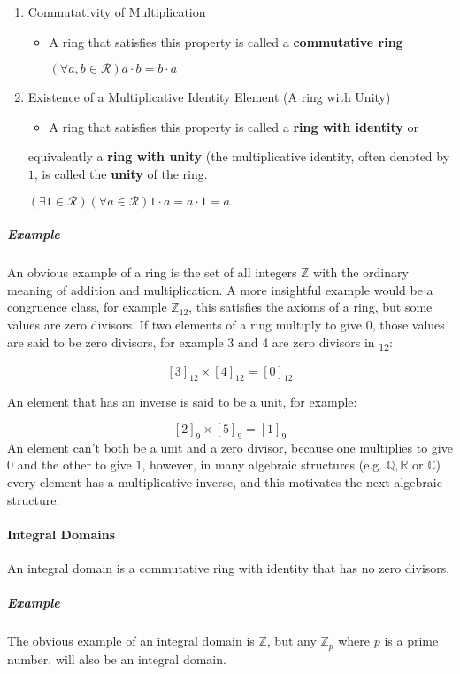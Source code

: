 \documentclass[a4paper,11pt,twoside]{article}
\begin{document}
\begin{enumerate}
\item Commutativity of Multiplication
\begin{itemize}
\item A ring that satisfies this property is called a \textbf{commutative ring}

\(\left( \forall a,b \in \mathcal{R} \right) a \cdot  b = b \cdot  a\)
\end{itemize}

\item Existence of a Multiplicative Identity Element (A ring with Unity)
\begin{itemize}
\item A ring that satisfies this property is called a \textbf{ring with identity} or
\end{itemize}
equivalently a \textbf{ring with unity} (the multiplicative identity, often
denoted by \(1\), is called the \textbf{unity} of the ring.

\(\left( \exists 1 \in \mathcal{R} \right) \left( \forall a \in \mathcal{R} \right) 1 \cdot  a = a \cdot  1 = a\)
\end{enumerate}
\subparagraph{Example}
\label{sec:org6a63756}
An obvious example of a ring is the set of all integers
\(\mathbb{Z}\) with the ordinary meaning of addition and
multiplication. A more insightful example would be a congruence
class, for example \(\mathbb{Z}_{12}\), this satisfies the axioms
of a ring, but some values are zero divisors. If two elements of a
ring multiply to give 0, those values are said to be zero divisors,
for example 3 and 4 are zero divisors in \textsubscript{12}:

\[
       \left[3\right]_{12}\times\left[4\right]_{12}=\left[0\right]_{12}
      \]

An element that has an inverse is said to be a unit, for example:

 \[
     \left[2\right]_{9}\times\left[5\right]_{9}=\left[1\right]_{9}
     \]
An element can't both be a unit and a zero divisor, because one
multiplies to give 0 and the other to give 1, however, in many
algebraic structures (e.g. \(\mathbb{Q}, \mathbb{R}\) or
\(\mathbb{C}\)) every element has a multiplicative inverse, and
this motivates the next algebraic structure. 

\paragraph{Integral Domains}
\label{sec:org0f2fbda}
An integral domain is a commutative ring with identity that has no
zero divisors.
\subparagraph{Example}
\label{sec:org51a9357}
The obvious example of an integral domain is \(\mathbb{Z}\), but any
\(\mathbb{Z}_p\) where \(p\) is a prime number, will also be an integral domain.
\end{document}
